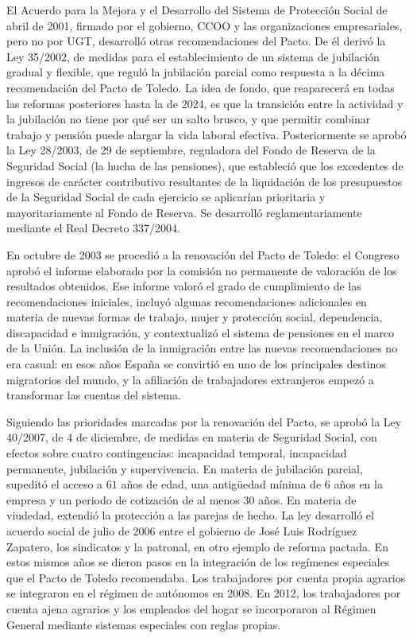 \documentclass[10pt,a4paper]{article}
\begin{document}
El Acuerdo para la Mejora y el Desarrollo del Sistema de Protección Social de abril de 2001, firmado por el gobierno, CCOO y las organizaciones empresariales, pero no por UGT, desarrolló otras recomendaciones del Pacto. De él derivó la Ley 35/2002, de medidas para el establecimiento de un sistema de jubilación gradual y flexible, que reguló la jubilación parcial como respuesta a la décima recomendación del Pacto de Toledo. La idea de fondo, que reaparecerá en todas las reformas posteriores hasta la de 2024, es que la transición entre la actividad y la jubilación no tiene por qué ser un salto brusco, y que permitir combinar trabajo y pensión puede alargar la vida laboral efectiva. Posteriormente se aprobó la Ley 28/2003, de 29 de septiembre, reguladora del Fondo de Reserva de la Seguridad Social (la hucha de las pensiones), que estableció que los excedentes de ingresos de carácter contributivo resultantes de la liquidación de los presupuestos de la Seguridad Social de cada ejercicio se aplicarían prioritaria y mayoritariamente al Fondo de Reserva. Se desarrolló reglamentariamente mediante el Real Decreto 337/2004. 

En octubre de 2003 se procedió a la renovación del Pacto de Toledo: el Congreso aprobó el informe elaborado por la comisión no permanente de valoración de los resultados obtenidos. Ese informe valoró el grado de cumplimiento de las recomendaciones iniciales, incluyó algunas recomendaciones adicionales en materia de nuevas formas de trabajo, mujer y protección social, dependencia, discapacidad e inmigración, y contextualizó el sistema de pensiones en el marco de la Unión. La inclusión de la inmigración entre las nuevas recomendaciones no era casual: en esos años España se convirtió en uno de los principales destinos migratorios del mundo, y la afiliación de trabajadores extranjeros empezó a transformar las cuentas del sistema.

Siguiendo las prioridades marcadas por la renovación del Pacto, se aprobó la Ley 40/2007, de 4 de diciembre, de medidas en materia de Seguridad Social, con efectos sobre cuatro contingencias: incapacidad temporal, incapacidad permanente, jubilación y supervivencia. En materia de jubilación parcial, supeditó el acceso a $61$ años de edad, una antigüedad mínima de $6$ años en la empresa y un periodo de cotización de al menos $30$ años. En materia de viudedad, extendió la protección a las parejas de hecho. La ley desarrolló el acuerdo social de julio de 2006 entre el gobierno de José Luis Rodríguez Zapatero, los sindicatos y la patronal, en otro ejemplo de reforma pactada. En estos mismos años se dieron pasos en la integración de los regímenes especiales que el Pacto de Toledo recomendaba. Los trabajadores por cuenta propia agrarios se integraron en el régimen de autónomos en 2008. En 2012, los trabajadores por cuenta ajena agrarios y los empleados del hogar se incorporaron al Régimen General mediante sistemas especiales con reglas propias. 
\end{document}
